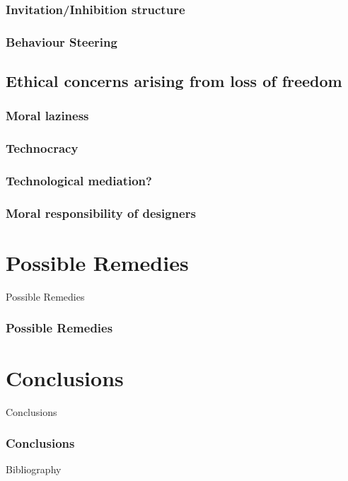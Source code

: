 \documentclass{beamer}
\begin{document}
\begin{frame}
\frametitle{Invitation/Inhibition structure}
\end{frame}

\begin{frame}
\frametitle{Behaviour Steering}
\end{frame}

\subsection{Ethical concerns arising from loss of freedom}

\begin{frame}
	\frametitle{Moral laziness}
\end{frame}

\begin{frame}
	\frametitle{Technocracy}
\end{frame}

\begin{frame}
	\frametitle{Technological mediation? }
\end{frame}

\begin{frame}
	\frametitle{Moral responsibility of designers}
\end{frame}

\section{Possible Remedies}
\begin{frame}
\begin{center} 
	 Possible Remedies
\end{center}
\end{frame}

\begin{frame}
\frametitle{Possible Remedies}
\end{frame}

\section{Conclusions}
\begin{frame}
\begin{center} 
	 Conclusions
\end{center}
\end{frame}

\begin{frame}
\frametitle{Conclusions}
\end{frame}

\nocite{*}
\begin{frame}{Bibliography}
\renewcommand*{\bibfont}{\footnotesize}
\printbibliography
\end{frame}
\end{document}
